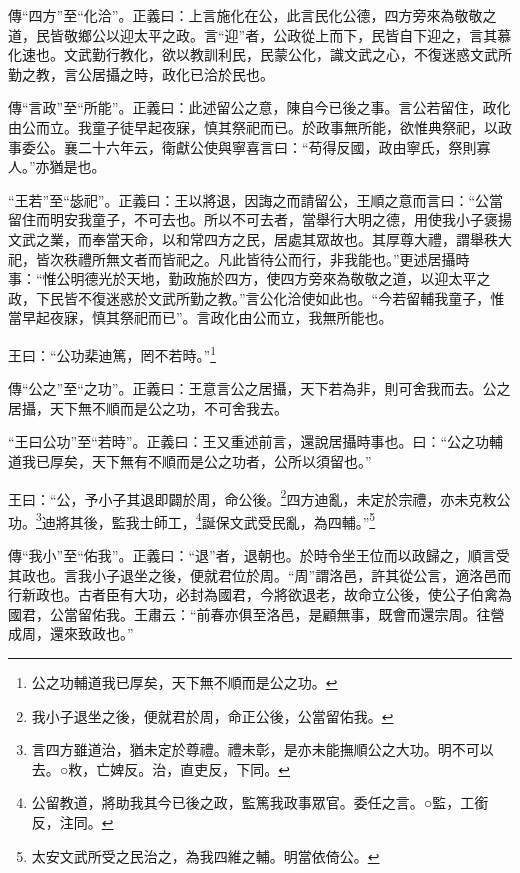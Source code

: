 {\noindent\zhuan{}\fzbyks 傳“四方”至“化洽”。正義曰：上言施化在公，此言民化公德，四方旁來為敬敬之道，民皆敬鄉公以迎太平之政。言“迎”者，公政從上而下，民皆自下迎之，言其慕化速也。文武勤行教化，欲以教訓利民，民蒙公化，識文武之心，不復迷惑文武所勤之教，言公居攝之時，政化已洽於民也。 \par}

{\noindent\zhuan{}\fzbyks 傳“言政”至“所能”。正義曰：此述留公之意，陳自今已後之事。言公若留住，政化由公而立。我童子徒早起夜寐，慎其祭祀而已。於政事無所能，欲惟典祭祀，以政事委公。襄二十六年云，衛獻公使與寧喜言曰：“苟得反國，政由寧氏，祭則寡人。”亦猶是也。 \par}

{\noindent\shu{}\fzkt “王若”至“毖祀”。正義曰：王以將退，因誨之而請留公，王順之意而言曰：“公當留住而明安我童子，不可去也。所以不可去者，當舉行大明之德，用使我小子褒揚文武之業，而奉當天命，以和常四方之民，居處其眾故也。其厚尊大禮，謂舉秩大祀，皆次秩禮所無文者而皆祀之。凡此皆待公而行，非我能也。”更述居攝時事：“惟公明德光於天地，勤政施於四方，使四方旁來為敬敬之道，以迎太平之政，下民皆不復迷惑於文武所勤之教。”言公化洽使如此也。“今若留輔我童子，惟當早起夜寐，慎其祭祀而已”。言政化由公而立，我無所能也。 \par}

王曰：“公功棐迪篤，罔不若時。”\footnote{公之功輔道我已厚矣，天下無不順而是公之功。}

{\noindent\zhuan{}\fzbyks 傳“公之”至“之功”。正義曰：王意言公之居攝，天下若為非，則可舍我而去。公之居攝，天下無不順而是公之功，不可舍我去。 \par}

{\noindent\shu{}\fzkt “王曰公功”至“若時”。正義曰：王又重述前言，還說居攝時事也。曰：“公之功輔道我已厚矣，天下無有不順而是公之功者，公所以須留也。” \par}

王曰：“公，予小子其退即闢於周，命公後。\footnote{我小子退坐之後，便就君於周，命正公後，公當留佑我。}四方迪亂，未定於宗禮，亦未克敉公功。\footnote{言四方雖道治，猶未定於尊禮。禮未彰，是亦未能撫順公之大功。明不可以去。○敉，亡婢反。治，直吏反，下同。}迪將其後，監我士師工，\footnote{公留教道，將助我其今已後之政，監篤我政事眾官。委任之言。○監，工銜反，注同。}誕保文武受民亂，為四輔。”\footnote{太安文武所受之民治之，為我四維之輔。明當依倚公。}


{\noindent\zhuan{}\fzbyks 傳“我小”至“佑我”。正義曰：“退”者，退朝也。於時令坐王位而以政歸之，順言受其政也。言我小子退坐之後，便就君位於周。“周”謂洛邑，許其從公言，適洛邑而行新政也。古者臣有大功，必封為國君，今將欲退老，故命立公後，使公子伯禽為國君，公當留佑我。王肅云：“前春亦俱至洛邑，是顧無事，既會而還宗周。往營成周，還來致政也。” \par}

